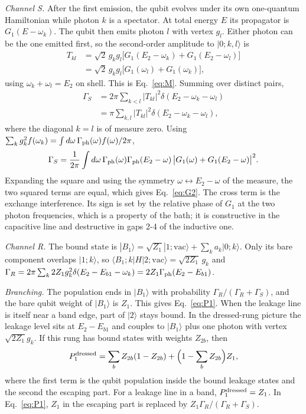\documentclass[aps,prresearch,twocolumn,superscriptaddress,nofootinbib,longbibliography,floatfix]{revtex4-2}
\begin{document}
\emph{Channel S.} After the first emission, the qubit evolves under its own one-quantum Hamiltonian while photon $k$ is a
spectator. At total energy $E$ its propagator is $G_1(E-\omega_k)$. The qubit then emits photon $l$ with vertex $g_l$.
Either photon can be the one emitted first, so the second-order amplitude to $|0;k,l\rangle$ is
\begin{align}
T_{kl}&=\sqrt2\,g_kg_l\big[G_1(E_2-\omega_k)+G_1(E_2-\omega_l)\big]\nonumber\\
&=\sqrt2\,g_kg_l\big[G_1(\omega_l)+G_1(\omega_k)\big],
\end{align}
using $\omega_k+\omega_l=E_2$ on shell. This is Eq.~\eqref{eq:M}. Summing over distinct pairs,
\begin{align}
\Gamma_S&=2\pi\sum_{k<l}|T_{kl}|^2\delta(E_2-\omega_k-\omega_l)\nonumber\\
&=\pi\sum_{k,l}|T_{kl}|^2\delta(E_2-\omega_k-\omega_l),
\end{align}
where the diagonal $k=l$ is of measure zero. Using $\sum_kg_k^2f(\omega_k)=\int d\omega\,\Gamma_{\rm ph}(\omega)f(\omega)/2\pi$,
\begin{equation}
\Gamma_S=\frac1{2\pi}\int d\omega\,\Gamma_{\rm ph}(\omega)\Gamma_{\rm ph}(E_2-\omega)\,\big|G_1(\omega)+G_1(E_2-\omega)\big|^2 .
\end{equation}
Expanding the square and using the symmetry $\omega\leftrightarrow E_2-\omega$ of the measure, the two squared terms are
equal, which gives Eq.~\eqref{eq:G2}. The cross term is the exchange interference. Its sign is set by the relative
phase of $G_1$ at the two photon frequencies, which is a property of the bath; it is constructive in the capacitive line
and destructive in gaps 2-4 of the inductive one.

\emph{Channel R.} The bound state is $|B_1\rangle=\sqrt{Z_1}|1;\mathrm{vac}\rangle+\sum_ka_k|0;k\rangle$. Only its bare
component overlaps $|1;k\rangle$, so $\langle B_1;k|H|2;\mathrm{vac}\rangle=\sqrt{2Z_1}\,g_k$ and
$\Gamma_R=2\pi\sum_k2Z_1g_k^2\delta(E_2-E_{b1}-\omega_k)=2Z_1\Gamma_{\rm ph}(E_2-E_{b1})$.

\emph{Branching.} The population ends in $|B_1\rangle$ with probability $\Gamma_R/(\Gamma_R+\Gamma_S)$, and the bare
qubit weight of $|B_1\rangle$ is $Z_1$. This gives Eq.~\eqref{eq:P1}. When the leakage line is itself near a band edge,
part of $|2\rangle$ stays bound. In the dressed-rung picture the leakage level sits at $E_2-E_{b1}$ and couples to
$|B_1\rangle$ plus one photon with vertex $\sqrt{2Z_1}g_k$. If this rung has bound states with weights $Z_{2b}$, then
\begin{equation}
P_1^{\rm dressed}=\sum_bZ_{2b}(1-Z_{2b})+\Big(1-\sum_bZ_{2b}\Big)Z_1 ,
\end{equation}
where the first term is the qubit population inside the bound leakage states and the second the escaping part. For a
leakage line in a band, $P_1^{\rm dressed}=Z_1$. In Eq.~\eqref{eq:P1}, $Z_1$ in the escaping part is replaced by
$Z_1\Gamma_R/(\Gamma_R+\Gamma_S)$.
\end{document}
